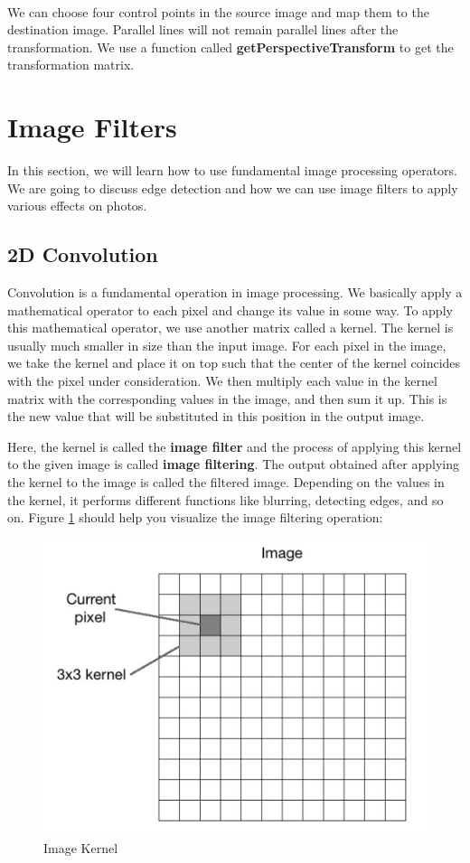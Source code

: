 \begin{center}
\end{center}
{ \hspace*{\fill} \\}

We can choose four control points in the source image and map them to the destination image. Parallel lines will not remain parallel lines after the transformation. We use a function called \textbf{getPerspectiveTransform} to get the transformation matrix.


\section{Image Filters}

In this section, we will learn how to use fundamental image processing operators. We are going to discuss edge detection and how we can use image filters to apply various effects on photos.

\subsection{2D Convolution}
Convolution is a fundamental operation in image processing. We basically apply a mathematical operator to each pixel and change its value in some way. To apply this mathematical operator, we use another matrix called a kernel. The kernel is usually much smaller in size than the input image. For each pixel in the image, we take the kernel and place it on top such that the center of the kernel coincides with the pixel under consideration. We then multiply each value in the kernel matrix with the corresponding values in the image, and then sum it up. This is the new value that will be substituted in this position in the output image.

Here, the kernel is called the \textbf{image filter} and the process of applying this kernel to the given image is called \textbf{image filtering}. The output obtained after applying the kernel to the image is called the filtered image. Depending on the values in the kernel, it performs different functions like blurring, detecting edges, and so on. Figure \ref{fig27} should help you visualize the image filtering operation:

\begin{figure}[H]
	\centering \includegraphics[width=0.6\columnwidth]{figures/Fig27.png}
	\caption{Image Kernel}
	\label{fig27}
\end{figure}

